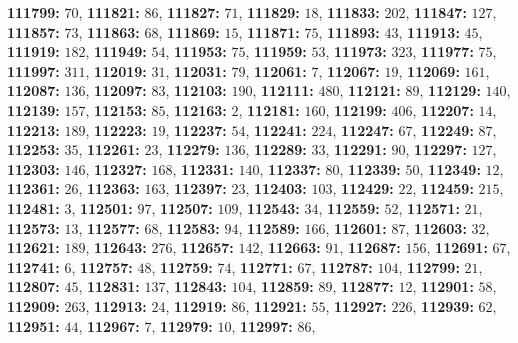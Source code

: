 \textsf{\bfseries 111799:} $70$, \textsf{\bfseries 111821:} $86$, \textsf{\bfseries 111827:} $71$, \textsf{\bfseries 111829:} $18$, \textsf{\bfseries 111833:} $202$, \textsf{\bfseries 111847:} $127$, \textsf{\bfseries 111857:} $73$, \textsf{\bfseries 111863:} $68$, \textsf{\bfseries 111869:} $15$, \textsf{\bfseries 111871:} $75$, \textsf{\bfseries 111893:} $43$, \textsf{\bfseries 111913:} $45$, \textsf{\bfseries 111919:} $182$, \textsf{\bfseries 111949:} $54$, \textsf{\bfseries 111953:} $75$, \textsf{\bfseries 111959:} $53$, \textsf{\bfseries 111973:} $323$, \textsf{\bfseries 111977:} $75$, \textsf{\bfseries 111997:} $311$, \textsf{\bfseries 112019:} $31$, \textsf{\bfseries 112031:} $79$, \textsf{\bfseries 112061:} $7$, \textsf{\bfseries 112067:} $19$, \textsf{\bfseries 112069:} $161$, \textsf{\bfseries 112087:} $136$, \textsf{\bfseries 112097:} $83$, \textsf{\bfseries 112103:} $190$, \textsf{\bfseries 112111:} $480$, \textsf{\bfseries 112121:} $89$, \textsf{\bfseries 112129:} $140$, \textsf{\bfseries 112139:} $157$, \textsf{\bfseries 112153:} $85$, \textsf{\bfseries 112163:} $2$, \textsf{\bfseries 112181:} $160$, \textsf{\bfseries 112199:} $406$, \textsf{\bfseries 112207:} $14$, \textsf{\bfseries 112213:} $189$, \textsf{\bfseries 112223:} $19$, \textsf{\bfseries 112237:} $54$, \textsf{\bfseries 112241:} $224$, \textsf{\bfseries 112247:} $67$, \textsf{\bfseries 112249:} $87$, \textsf{\bfseries 112253:} $35$, \textsf{\bfseries 112261:} $23$, \textsf{\bfseries 112279:} $136$, \textsf{\bfseries 112289:} $33$, \textsf{\bfseries 112291:} $90$, \textsf{\bfseries 112297:} $127$, \textsf{\bfseries 112303:} $146$, \textsf{\bfseries 112327:} $168$, \textsf{\bfseries 112331:} $140$, \textsf{\bfseries 112337:} $80$, \textsf{\bfseries 112339:} $50$, \textsf{\bfseries 112349:} $12$, \textsf{\bfseries 112361:} $26$, \textsf{\bfseries 112363:} $163$, \textsf{\bfseries 112397:} $23$, \textsf{\bfseries 112403:} $103$, \textsf{\bfseries 112429:} $22$, \textsf{\bfseries 112459:} $215$, \textsf{\bfseries 112481:} $3$, \textsf{\bfseries 112501:} $97$, \textsf{\bfseries 112507:} $109$, \textsf{\bfseries 112543:} $34$, \textsf{\bfseries 112559:} $52$, \textsf{\bfseries 112571:} $21$, \textsf{\bfseries 112573:} $13$, \textsf{\bfseries 112577:} $68$, \textsf{\bfseries 112583:} $94$, \textsf{\bfseries 112589:} $166$, \textsf{\bfseries 112601:} $87$, \textsf{\bfseries 112603:} $32$, \textsf{\bfseries 112621:} $189$, \textsf{\bfseries 112643:} $276$, \textsf{\bfseries 112657:} $142$, \textsf{\bfseries 112663:} $91$, \textsf{\bfseries 112687:} $156$, \textsf{\bfseries 112691:} $67$, \textsf{\bfseries 112741:} $6$, \textsf{\bfseries 112757:} $48$, \textsf{\bfseries 112759:} $74$, \textsf{\bfseries 112771:} $67$, \textsf{\bfseries 112787:} $104$, \textsf{\bfseries 112799:} $21$, \textsf{\bfseries 112807:} $45$, \textsf{\bfseries 112831:} $137$, \textsf{\bfseries 112843:} $104$, \textsf{\bfseries 112859:} $89$, \textsf{\bfseries 112877:} $12$, \textsf{\bfseries 112901:} $58$, \textsf{\bfseries 112909:} $263$, \textsf{\bfseries 112913:} $24$, \textsf{\bfseries 112919:} $86$, \textsf{\bfseries 112921:} $55$, \textsf{\bfseries 112927:} $226$, \textsf{\bfseries 112939:} $62$, \textsf{\bfseries 112951:} $44$, \textsf{\bfseries 112967:} $7$, \textsf{\bfseries 112979:} $10$, \textsf{\bfseries 112997:} $86$, 
